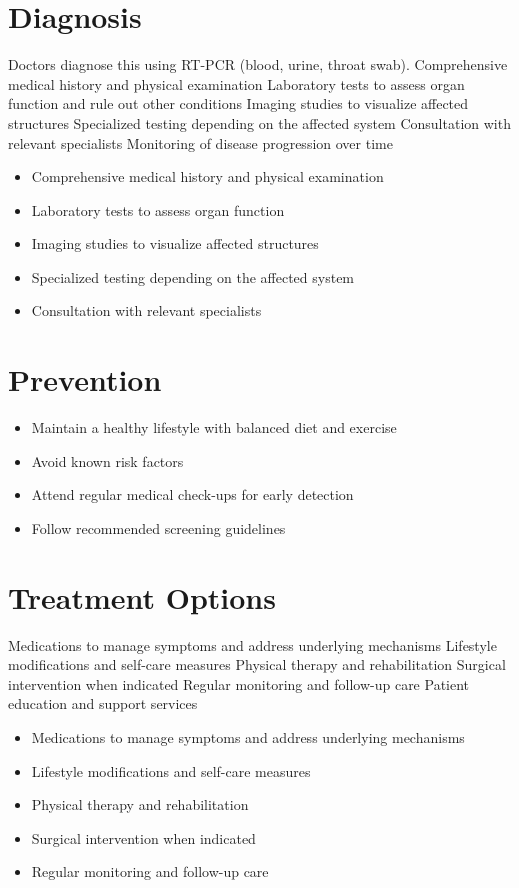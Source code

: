 \section{Diagnosis}
Doctors diagnose this using RT-PCR (blood, urine, throat swab). Comprehensive medical history and physical examination Laboratory tests to assess organ function and rule out other conditions Imaging studies to visualize affected structures Specialized testing depending on the affected system Consultation with relevant specialists Monitoring of disease progression over time

\begin{itemize}[noitemsep]
  \item Comprehensive medical history and physical examination
  \item Laboratory tests to assess organ function
  \item Imaging studies to visualize affected structures
  \item Specialized testing depending on the affected system
  \item Consultation with relevant specialists
\end{itemize}
\section{Prevention}
\begin{itemize}[noitemsep]
  \item Maintain a healthy lifestyle with balanced diet and exercise
  \item Avoid known risk factors
  \item Attend regular medical check-ups for early detection
  \item Follow recommended screening guidelines
\end{itemize}
\section{Treatment Options}
Medications to manage symptoms and address underlying mechanisms Lifestyle modifications and self-care measures Physical therapy and rehabilitation Surgical intervention when indicated Regular monitoring and follow-up care Patient education and support services

\begin{itemize}[noitemsep]
  \item Medications to manage symptoms and address underlying mechanisms
  \item Lifestyle modifications and self-care measures
  \item Physical therapy and rehabilitation
  \item Surgical intervention when indicated
  \item Regular monitoring and follow-up care
\end{itemize}
